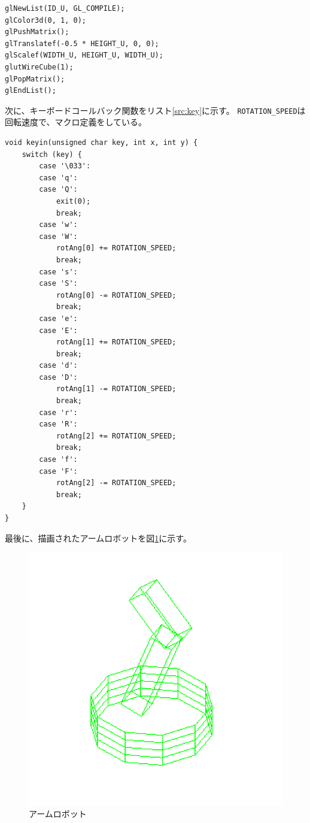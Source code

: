 \documentclass{jsarticle}
\begin{document}
        \begin{lstlisting}[caption=上腕の登録部, label=src:upper]
glNewList(ID_U, GL_COMPILE);
glColor3d(0, 1, 0);
glPushMatrix();
glTranslatef(-0.5 * HEIGHT_U, 0, 0);
glScalef(WIDTH_U, HEIGHT_U, WIDTH_U);
glutWireCube(1);
glPopMatrix();
glEndList();\end{lstlisting}

        次に、キーボードコールバック関数をリスト\ref{src:key}に示す。
        \verb|ROTATION_SPEED|は回転速度で、マクロ定義をしている。

        \begin{lstlisting}[caption=キーボードコールバック関数, label=src:key]
void keyin(unsigned char key, int x, int y) {
    switch (key) {
        case '\033':
        case 'q':
        case 'Q':
            exit(0);
            break;
        case 'w':
        case 'W':
            rotAng[0] += ROTATION_SPEED;
            break;
        case 's':
        case 'S':
            rotAng[0] -= ROTATION_SPEED;
            break;
        case 'e':
        case 'E':
            rotAng[1] += ROTATION_SPEED;
            break;
        case 'd':
        case 'D':
            rotAng[1] -= ROTATION_SPEED;
            break;
        case 'r':
        case 'R':
            rotAng[2] += ROTATION_SPEED;
            break;
        case 'f':
        case 'F':
            rotAng[2] -= ROTATION_SPEED;
            break;
    }
}\end{lstlisting}
        
        最後に、描画されたアームロボットを図\ref{fig:robot}に示す。

        \begin{figure}[h]
            \centering
            \includegraphics[width=0.5\hsize]{robot.png}
            \caption{アームロボット}
            \label{fig:robot}
        \end{figure}
\end{document}
